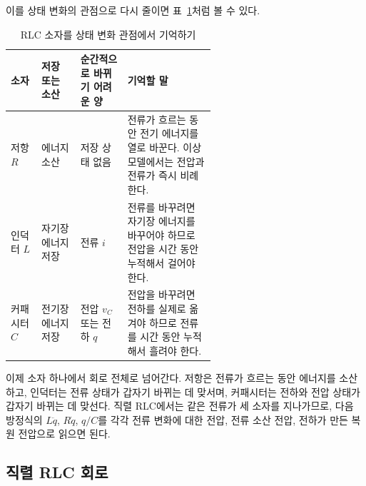 이를 상태 변화의 관점으로 다시 줄이면 표~\ref{tab:rlc-state-memory}처럼 볼 수 있다.
\begin{table}[!htbp]
  \centering
  \caption{RLC 소자를 상태 변화 관점에서 기억하기}
  \small
  \setlength{\tabcolsep}{3pt}
  \begin{tabularx}{\linewidth}{@{}>{\raggedright\arraybackslash}p{0.15\linewidth}>{\raggedright\arraybackslash}p{0.19\linewidth}>{\raggedright\arraybackslash}p{0.23\linewidth}>{\raggedright\arraybackslash}X@{}}
    \toprule
    소자 & 저장 또는 소산 & 순간적으로 바뀌기 어려운 양 & 기억할 말 \\
    \midrule
    저항 $R$ & 에너지 소산 & 저장 상태 없음 & 전류가 흐르는 동안 전기 에너지를 열로 바꾼다. 이상 모델에서는 전압과 전류가 즉시 비례한다. \\
    인덕터 $L$ & 자기장 에너지 저장 & 전류 $i$ & 전류를 바꾸려면 자기장 에너지를 바꾸어야 하므로 전압을 시간 동안 누적해서 걸어야 한다. \\
    커패시터 $C$ & 전기장 에너지 저장 & 전압 $v_C$ 또는 전하 $q$ & 전압을 바꾸려면 전하를 실제로 옮겨야 하므로 전류를 시간 동안 누적해서 흘려야 한다. \\
    \bottomrule
  \end{tabularx}
  \label{tab:rlc-state-memory}
\end{table}

이제 소자 하나에서 회로 전체로 넘어간다.
저항은 전류가 흐르는 동안 에너지를 소산하고, 인덕터는 전류 상태가 갑자기 바뀌는 데 맞서며, 커패시터는 전하와 전압 상태가 갑자기 바뀌는 데 맞선다.
직렬 RLC에서는 같은 전류가 세 소자를 지나가므로, 다음 방정식의 $L\ddot{q}$, $R\dot{q}$, $q/C$를 각각 전류 변화에 대한 전압, 전류 소산 전압, 전하가 만든 복원 전압으로 읽으면 된다.

\subsection{직렬 RLC 회로}

